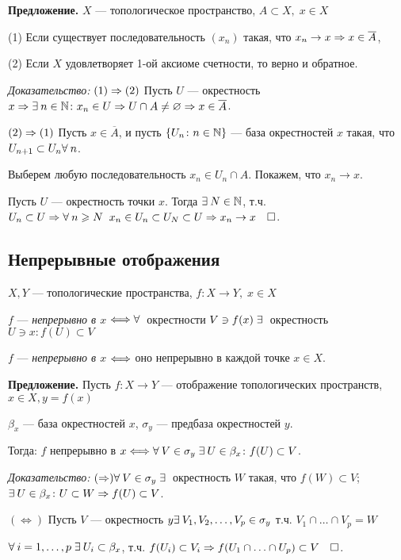 \documentclass[../../main.tex]{subfiles}
\begin{document}
\textbf{Предложение.} $X$ — топологическое пространство, $A \subset X, \; x \in X$

(1) Если существует последовательность $(x_n)$ такая, что $x_n \to x \Rightarrow x \in \overline{A}$,

(2) Если $X$ удовлетворяет 1-ой аксиоме счетности, то верно и обратное.

\textit{Доказательство:} $(1) \Rightarrow (2)$ Пусть $U$ — окрестность $x \Rightarrow \exists\: n \in \mathbb{N} \colon x_n \in U \Rightarrow U \cap A \neq \varnothing \Rightarrow x \in \overline{A}$.

$(2) \Rightarrow (1)$ Пусть $x \in \overline{A}$, и пусть $\left\{ U_n \colon n \in \mathbb{N} \right\}$ — база окрестностей $x$ такая, что $U_{n+1} \subset U_n \forall\: n$.

Выберем любую последовательность $x_n \in U_n \cap A$. Покажем, что $x_n \to x$.

Пусть $U$ — окрестность точки $x$. Тогда $\exists\: N \in \mathbb{N}$, т.ч. $U_n \subset U \Rightarrow \forall\: n \geqslant N \;\; x_n \in U_n \subset U_N \subset U \Rightarrow x_n \to x \quad \square$.


\subsection{Непрерывные отображения}

 $X, Y$ — топологические пространства, $f \colon X \to Y, \; x \in X$

$f$ — \textit{непрерывно в $x$} $\Longleftrightarrow \forall\:$ окрестности $V \ni f(x) \; \exists\:$ окрестность $U \ni x \colon f(U) \subset V$

$f$ — \textit{непрерывно в $x$} $\Longleftrightarrow$ оно непрерывно в каждой точке $x \in X$.

\textbf{Предложение.} Пусть $f \colon X \to Y$ — отображение топологических пространств, $x \in X, y = f(x)$

$\beta_x$ — база окрестностей $x$, $\sigma_y$ — предбаза окрестностей $y$.

Тогда: $f$ непрерывно в $x \Longleftrightarrow \forall\: V \in \sigma_y \; \exists\: U \in \beta_x \colon f(U) \subset V$.

\textit{Доказательство:} $(\Rightarrow) \forall\: V \in \sigma_y \; \exists\:$ окрестность $W$ такая, что $f(W) \subset V$; $\exists\: U \in \beta_x \colon U \subset W \Rightarrow f(U) \subset V$.

$(\Leftrightarrow)$ Пусть $V$ — окрестность $y  \exists\: V_1, V_2, \ldots, V_p \in \sigma_y$ т.ч. $V_1 \cap \ldots \cap V_p = W$

$\forall\: i = 1, \ldots, p \; \exists\: U_i \subset \beta_x$, т.ч. $f(U_i) \subset V_i \Rightarrow f(U_1 \cap \ldots \cap U_p) \subset V \quad \square$.
\end{document}
